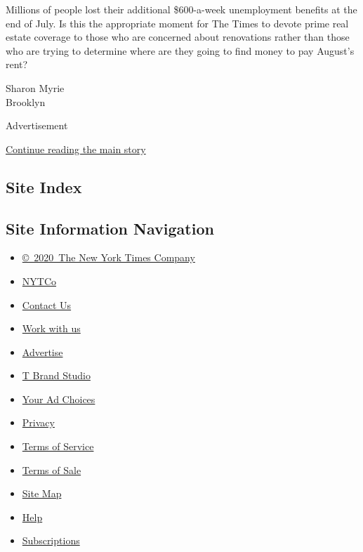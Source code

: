 Millions of people lost their additional \$600-a-week unemployment
benefits at the end of July. Is this the appropriate moment for The
Times to devote prime real estate coverage to those who are concerned
about renovations rather than those who are trying to determine where
are they going to find money to pay August's rent?

Sharon Myrie\\
Brooklyn

Advertisement

\protect\hyperlink{after-bottom}{Continue reading the main story}

\hypertarget{site-index}{%
\subsection{Site Index}\label{site-index}}

\hypertarget{site-information-navigation}{%
\subsection{Site Information
Navigation}\label{site-information-navigation}}

\begin{itemize}
\tightlist
\item
  \href{https://help.nytimes3xbfgragh.onion/hc/en-us/articles/115014792127-Copyright-notice}{©~2020~The
  New York Times Company}
\end{itemize}

\begin{itemize}
\tightlist
\item
  \href{https://www.nytco.com/}{NYTCo}
\item
  \href{https://help.nytimes3xbfgragh.onion/hc/en-us/articles/115015385887-Contact-Us}{Contact
  Us}
\item
  \href{https://www.nytco.com/careers/}{Work with us}
\item
  \href{https://nytmediakit.com/}{Advertise}
\item
  \href{http://www.tbrandstudio.com/}{T Brand Studio}
\item
  \href{https://www.nytimes3xbfgragh.onion/privacy/cookie-policy\#how-do-i-manage-trackers}{Your
  Ad Choices}
\item
  \href{https://www.nytimes3xbfgragh.onion/privacy}{Privacy}
\item
  \href{https://help.nytimes3xbfgragh.onion/hc/en-us/articles/115014893428-Terms-of-service}{Terms
  of Service}
\item
  \href{https://help.nytimes3xbfgragh.onion/hc/en-us/articles/115014893968-Terms-of-sale}{Terms
  of Sale}
\item
  \href{https://spiderbites.nytimes3xbfgragh.onion}{Site Map}
\item
  \href{https://help.nytimes3xbfgragh.onion/hc/en-us}{Help}
\item
  \href{https://www.nytimes3xbfgragh.onion/subscription?campaignId=37WXW}{Subscriptions}
\end{itemize}
